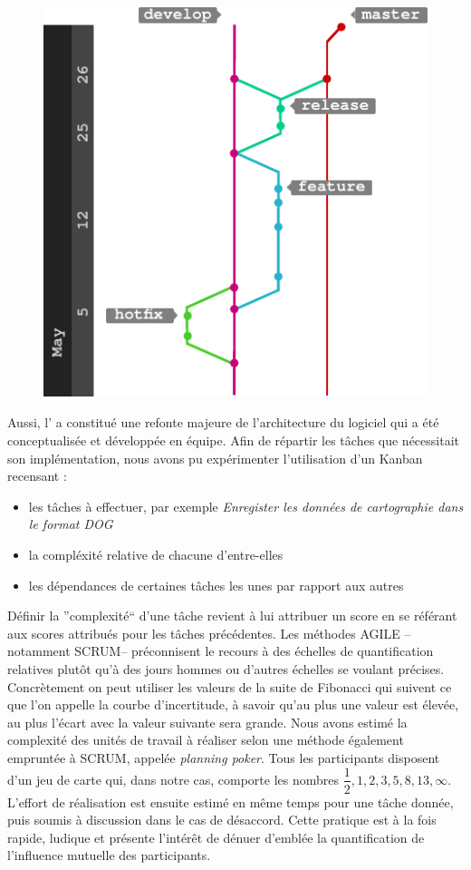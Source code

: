   \begin{figure}
    \centering
      \includegraphics[width=.7\linewidth]{figures/gitflow}  
    \label{fig:gitflow}
  \end{figure}
  
  Aussi, l' a constitué une refonte majeure de l'architecture du logiciel qui a été conceptualisée et développée en équipe. 
  Afin de répartir les tâches que nécessitait son implémentation, nous avons pu expérimenter l'utilisation d'un \gls{Kanban} recensant : 
  
  \begin{itemize}
   \item les tâches à effectuer, par exemple \emph{Enregister les données de cartographie dans le format DOG}
   \item la compléxité relative de chacune d'entre-elles 
   \item les dépendances de certaines tâches les unes par rapport aux autres
  \end{itemize}

  Définir la ''complexité`` d'une tâche revient à lui attribuer un score en se référant aux scores attribués pour les tâches précédentes. 
  Les méthodes AGILE --notamment SCRUM-- préconnisent le recours à des échelles de quantification relatives plutôt qu'à des jours hommes ou d'autres échelles se voulant précises. 
  Concrètement on peut utiliser les valeurs de la suite de Fibonacci qui suivent ce que l'on appelle la courbe d'incertitude, à savoir qu'au plus une valeur est élevée, au plus l'écart avec la valeur suivante sera grande. 
  Nous avons estimé la complexité des unités de travail à réaliser selon une méthode également empruntée à SCRUM, appelée \emph{planning poker}. 
  Tous les participants disposent d'un jeu de carte qui, dans notre cas, comporte les nombres $\dfrac{1}2, 1, 2, 3, 5, 8, 13, \infty$. 
  L'effort de réalisation est ensuite estimé en même temps pour une tâche donnée, puis soumis à discussion dans le cas de désaccord. 
  Cette pratique est à la fois rapide, ludique et présente l'intérêt de dénuer d'emblée la quantification de l'influence mutuelle des participants. 
  
